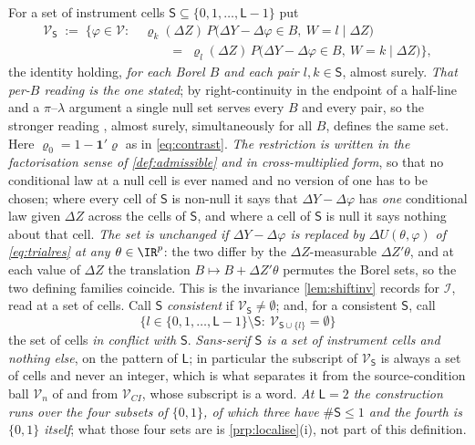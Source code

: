 \begin{definition}\label{def:cellsets}
For a set of instrument cells $\mathsf S\subseteq\{0,1,\dots,\mathsf L-1\}$ put
\[
\begin{aligned}
\mathcal V_{\mathsf S}\;:=\;\Big\{\varphi\in\mathcal V:\ &\varrho_k(\Delta Z)\,P\big(\Delta Y-\Delta\varphi\in B,\ W=l\mid\Delta Z\big)\\[-2pt]
&\qquad=\;\varrho_l(\Delta Z)\,P\big(\Delta Y-\Delta\varphi\in B,\ W=k\mid\Delta Z\big)\Big\},
\end{aligned}
\]
the identity holding, \emph{for each Borel $B$ and each pair $l,k\in\mathsf S$}, almost surely. \emph{That
per-$B$ reading is the one stated}; by right-continuity in the endpoint of a half-line and a
$\pi$--$\lambda$ argument a single null set serves every $B$ and every pair, so the stronger reading
, almost surely, simultaneously for all $B$, defines the same set. Here
$\varrho_0=1-\mathbf 1'\varrho$ as in \eqref{eq:contrast}. \emph{The restriction is written in the
factorisation sense of \cref{def:admissible} and in cross-multiplied form}, so that no conditional law
at a null cell is ever named and no version of one has to be chosen; where every cell of $\mathsf S$ is
non-null it says that $\Delta Y-\Delta\varphi$ has \emph{one} conditional law given $\Delta Z$ across the
cells of $\mathsf S$, and where a cell of $\mathsf S$ is null it says nothing about that cell.
\emph{The set is unchanged if $\Delta Y-\Delta\varphi$ is replaced by $\Delta U(\theta,\varphi)$ of
\eqref{eq:trialres} at any $\theta\in\IR^{p}$}: the two differ by the $\Delta Z$-measurable
$\Delta Z'\theta$, and at each value of $\Delta Z$ the translation $B\mapsto B+\Delta Z'\theta$ permutes
the Borel sets, so the two defining families coincide. This is the invariance \cref{lem:shiftinv} records
for $\mathcal I$, read at a set of cells. Call
$\mathsf S$ \emph{consistent} if $\mathcal V_{\mathsf S}\neq\emptyset$; and, for a consistent
$\mathsf S$, call
\[
\big\{l\in\{0,1,\dots,\mathsf L-1\}\setminus\mathsf S:\ \mathcal V_{\mathsf S\cup\{l\}}=\emptyset\big\}
\]
the set of cells \emph{in conflict with} $\mathsf S$. \emph{Sans-serif $\mathsf S$ is a set of instrument
cells and nothing else}, on the pattern of $\mathsf L$; in particular the subscript of
$\mathcal V_{\mathsf S}$ is always a set of cells and never an integer, which is what separates it from
the source-condition ball $\mathcal V_n$ of  and from $\mathcal V_{CI}$, whose subscript
is a word. \emph{At $\mathsf L=2$ the construction runs over the four subsets of $\{0,1\}$, of which
three have $\#\mathsf S\le1$ and the fourth is $\{0,1\}$ itself}; what those four sets are is
\cref{prp:localise}\textup{(i)}, not part of this definition.
\end{definition}

